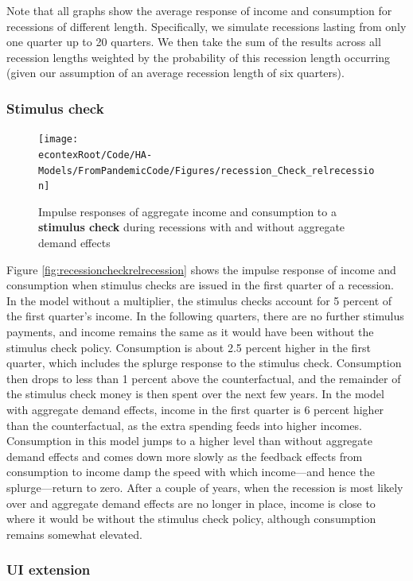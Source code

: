 \documentclass[\econtexRoot/HAFiscal]{subfiles}
\begin{document}
Note that all graphs show the average response of income and consumption for recessions of different length. Specifically, we simulate recessions lasting from only one quarter up to 20 quarters. We then take the sum of the results across all recession lengths weighted by the probability of this recession length occurring (given our assumption of an average recession length of six quarters).

\subsubsection{Stimulus check} 

\begin{figure}
  \centering
  \texttt{[image: \\econtexRoot/Code/HA-Models/FromPandemicCode/Figures/recession\_Check\_relrecession]}
  \caption{Impulse responses of aggregate income and consumption to a \textbf{stimulus check} during recessions with and without aggregate demand effects}
  \notinsubfile{\label{fig:recessioncheckrelrecession}}
\end{figure}

Figure \ref{fig:recessioncheckrelrecession} shows the impulse response of income and consumption when stimulus checks are issued in the first quarter of a recession. In the model without a multiplier, the stimulus checks account for 5 percent of the first quarter's income. In the following quarters, there are no further stimulus payments, and income remains the same as it would have been without the stimulus check policy. Consumption is about 2.5 percent higher in the first quarter, which includes the splurge response to the stimulus check. Consumption then drops to less than 1 percent above the counterfactual, and the remainder of the stimulus check money is then spent over the next few years. In the model with aggregate demand effects, income in the first quarter is 6 percent higher than the counterfactual, as the extra spending feeds into higher incomes. Consumption in this model jumps to a higher level than without aggregate demand effects and comes down more slowly as the feedback effects from consumption to income damp the speed with which income---and hence the splurge---return to zero. After a couple of years, when the recession is most likely over and aggregate demand effects are no longer in place, income is close to where it would be without the stimulus check policy, although consumption remains somewhat elevated.

\subsubsection{UI extension}
\end{document}
